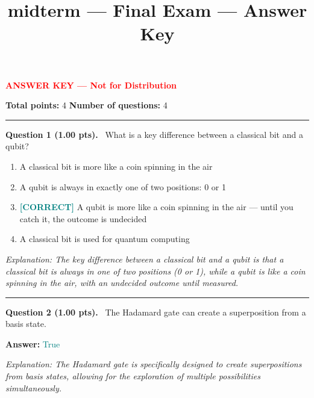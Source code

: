 \documentclass[12pt,a4paper]{article}
\title{midterm --- Final Exam --- Answer Key}
\date{}
\begin{document}
\maketitle

{\large \textbf{\textcolor{red}{ANSWER KEY --- Not for Distribution}}}

\vspace{0.5em}



\noindent
\textbf{Total points:} 4
\hfill
\textbf{Number of questions:} 4

\vspace{1em}
\hrule
\vspace{1.5em}


\noindent
\textbf{Question 1 (1.00 pts).}~
What is a key difference between a classical bit and a qubit?


\begin{enumerate}[label=\textbf{\Alph*.}]

  \item A classical bit is more like a coin spinning in the air

  \item A qubit is always in exactly one of two positions: 0 or 1

  \item \textbf{\textcolor{teal}{[CORRECT]}}  A qubit is more like a coin spinning in the air --- until you catch it, the outcome is undecided

  \item A classical bit is used for quantum computing

\end{enumerate}



\textit{\small Explanation: The key difference between a classical bit and a qubit is that a classical bit is always in one of two positions (0 or 1), while a qubit is like a coin spinning in the air, with an undecided outcome until measured.}



\vspace{0.8em}
\noindent\rule{\linewidth}{0.2pt}
\vspace{0.3em}


\noindent
\textbf{Question 2 (1.00 pts).}~
The Hadamard gate can create a superposition from a basis state.


\textbf{Answer:} \textcolor{teal}{True}



\textit{\small Explanation: The Hadamard gate is specifically designed to create superpositions from basis states, allowing for the exploration of multiple possibilities simultaneously.}
\end{document}
